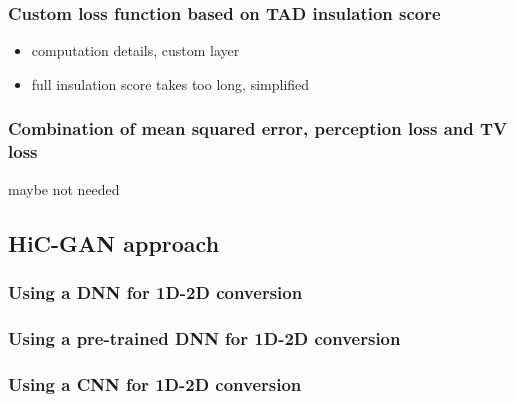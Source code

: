 \subsubsection{Custom loss function based on TAD insulation score}
\begin{itemize}
 \item computation details, custom layer
 \item full insulation score takes too long, simplified
\end{itemize}

\subsubsection{Combination of mean squared error, perception loss and TV loss}
maybe not needed

\subsection{HiC-GAN approach}
\subsubsection{Using a DNN for 1D-2D conversion}
\subsubsection{Using a pre-trained DNN for 1D-2D conversion}
\subsubsection{Using a CNN for 1D-2D conversion}








